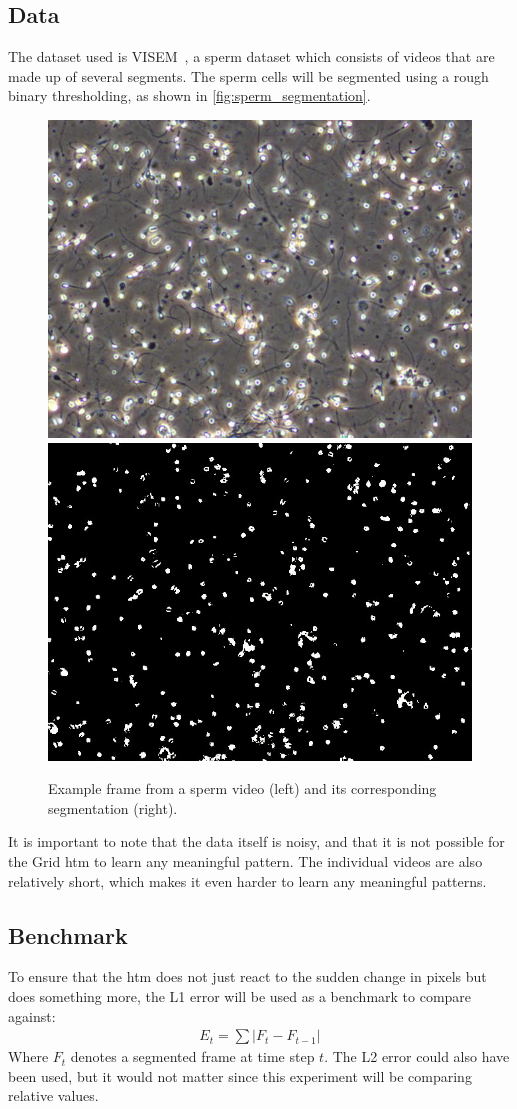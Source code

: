 \subsection{Data}
The dataset used is VISEM~\cite{VISEM}, a sperm dataset which consists of videos that are made up of several segments. The sperm cells will be segmented using a rough binary thresholding, as shown in \autoref{fig:sperm_segmentation}.
\begin{figure}[H]
    \centering
    \includegraphics[width=.45\textwidth]{resources/experiments/sperm/sperm_example.png}
    \includegraphics[width=.45\textwidth]{resources/experiments/sperm/sperm_seg_example.png}
    \caption[Sperm Example Frame]{Example frame from a sperm video (left) and its corresponding segmentation (right).}
    \label{fig:sperm_segmentation}
\end{figure}
It is important to note that the data itself is noisy, and that it is not possible for the Grid \gls*{htm} to learn any meaningful pattern. The individual videos are also relatively short, which makes it even harder to learn any meaningful patterns.
\subsection{Benchmark}
To ensure that the \gls*{htm} does not just react to the sudden change in pixels but does something more, the L1 error will be used as a benchmark to compare against:
\begin{align*}
    E_t=\sum|F_t-F_{t-1}|
\end{align*}
Where $F_t$ denotes a segmented frame at time step $t$. The L2 error could also have been used, but it would not matter since this experiment will be comparing relative values.
